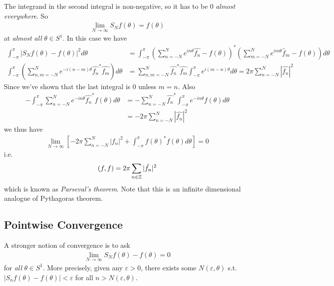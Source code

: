 \documentclass[a4paper]{article}
\begin{document}
The integrand in the second integral is non-negative, so it has to be 0 \emph{almost everywhere}. So
\begin{equation*}
\begin{aligned}
\lim_{N\to \infty} S_N f\left(\theta\right) = f\left(\theta\right)
\end{aligned}
\end{equation*}
at \emph{almost all} $\theta \in S^1$. In this case we have 
\begin{equation*}
\begin{aligned}
\int_{-\pi}^\pi |S_N f\left(\theta\right) - f\left(\theta\right) |^2 d\theta &= \int_{-\pi}^\pi \left(\sum_{n=-N}^N e^{in\theta} \hat{f_n} - f\left(\theta\right)\right)^* \left(\sum_{m=-N}^N e^{im\theta} \hat{f}_m - f\left(\theta\right)\right) d\theta\\
\int_{-\pi}^\pi \left(\sum_{n,m=-N}^N e^{-i\left(n-m\right)\theta} \hat{f_n}^* \hat{f_m}\right) d\theta &= \sum_{n,m=-N}^N \hat{f_n}^* \hat{f_m} \int_{-\pi}^\pi e^{i\left(m-n\right)\theta} d\theta = 2\pi \sum_{n=-N}^N |\hat{f_n}|^2
\end{aligned}
\end{equation*}
Since we've shown that the last integral is 0 unless $m=n$. Also
\begin{equation*}
\begin{aligned}
-\int_{-\pi}^\pi \sum_{n=-N}^N e^{-in\theta} \hat{f_n}^* f\left(\theta\right) d\theta &= -\sum_{n=-N}^N \hat{f_n}^* \int_{-\pi}^\pi e^{-in\theta} f\left(\theta\right) d\theta \\&= -2\pi \sum_{n=-N}^N |\hat{f_n}|^2
\end{aligned}
\end{equation*}
we thus have
\begin{equation*}
\begin{aligned}
\lim_{N \to \infty} \left[-2\pi \sum_{n=-N}^N |f_n|^2 + \int_{-\pi}^\pi f\left(\theta\right)^* f\left(\theta\right)d\theta\right] = 0
\end{aligned}
\end{equation*}
i.e.
\begin{equation*}
\begin{aligned}
\left(f,f\right) = 2\pi \sum_{n\in \mathbb{Z}} |\hat{f_n}|^2
\end{aligned}
\end{equation*}
which is known as \emph{Parseval's theorem}. Note that this is an infinite dimensional analogue of Pythagoras theorem.

\subsection{Pointwise Convergence}
A stronger notion of convergence is to ask
\begin{equation*}
\begin{aligned}
\lim_{N\to\infty} S_N f\left(\theta\right) - f\left(\theta\right) = 0
\end{aligned}
\end{equation*}
for \emph{all} $\theta \in S^1$. More precisely, given any $\varepsilon>0$, there exists some $N\left(\varepsilon,\theta\right)$ s.t. $|S_n f\left(\theta\right) - f\left(\theta\right)| <\varepsilon$ for all $n>N\left(\varepsilon,\theta\right)$.
\end{document}

